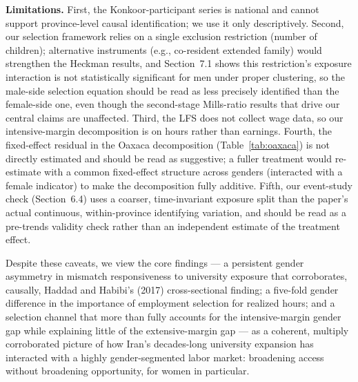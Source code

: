 \documentclass[11pt]{article}
\begin{document}
\textbf{Limitations.} First, the Konkoor-participant series is national and cannot support province-level causal identification; we use it only descriptively. Second, our selection framework relies on a single exclusion restriction (number of children); alternative instruments (e.g., co-resident extended family) would strengthen the Heckman results, and Section~7.1 shows this restriction's exposure interaction is not statistically significant for men under proper clustering, so the male-side selection equation should be read as less precisely identified than the female-side one, even though the second-stage Mills-ratio results that drive our central claims are unaffected. Third, the LFS does not collect wage data, so our intensive-margin decomposition is on hours rather than earnings. Fourth, the fixed-effect residual in the Oaxaca decomposition (Table~\ref{tab:oaxaca}) is not directly estimated and should be read as suggestive; a fuller treatment would re-estimate with a common fixed-effect structure across genders (interacted with a female indicator) to make the decomposition fully additive. Fifth, our event-study check (Section~6.4) uses a coarser, time-invariant exposure split than the paper's actual continuous, within-province identifying variation, and should be read as a pre-trends validity check rather than an independent estimate of the treatment effect.

Despite these caveats, we view the core findings --- a persistent gender asymmetry in mismatch responsiveness to university exposure that corroborates, causally, Haddad and Habibi's (2017) cross-sectional finding; a five-fold gender difference in the importance of employment selection for realized hours; and a selection channel that more than fully accounts for the intensive-margin gender gap while explaining little of the extensive-margin gap --- as a coherent, multiply corroborated picture of how Iran's decades-long university expansion has interacted with a highly gender-segmented labor market: broadening access without broadening opportunity, for women in particular.
\end{document}
